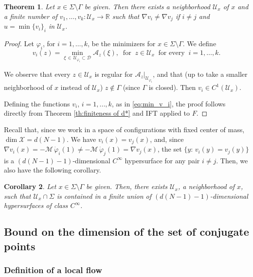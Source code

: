 \documentclass[a4paper,10pt]{amsart}
\theoremstyle{plain}
\newtheorem{thm}{Theorem}
\newtheorem{cor}[thm]{Corollary}
\theoremstyle{definition}
\numberwithin{equation}{section}
\numberwithin{thm}{section}
\begin{document}
\begin{thm}\label{thm:finite_number_vi}
Let $x \in \Sigma \setminus \Gamma$ be given. Then there exists a neighborhood $\mathcal U_{x}$ of $x$ and a finite number of $v_1, \dots, v_k : \mathcal U_{x} \to \mathbb R$ such that $\nabla v_i \neq \nabla v_j$ if $i \neq j$ and $u=\min\{v_i\}_i$ in $\mathcal U_{x}$.
\end{thm}
\begin{proof}
Let $\varphi_i$, for $i=1, \dots, k$, be the minimizers for $x \in \Sigma \setminus \Gamma$. We define
\begin{equation}\label{eq:min_v_i}
v_i(z) = \min_{\xi \, \in \,  \mathcal U_{\varphi_i} \subset \mathcal{D}} \mathcal A_z(\xi), \ \mbox{ for } \ z \in \mathcal U_x \ \mbox{ for every } \ i =1, \dots, k.
\end{equation}

We observe that every $z \in \mathcal U_x$ is regular for $\mathcal A_z|_{\mathcal U_{\varphi_i}}$, and that (up to take a smaller neighborhood of $x$ instead of $\mathcal U_x$) $z \notin \Gamma$ (since $\Gamma$ is closed). Then $v_i \in C^1(\mathcal U_x)$. 

Defining the functions $v_i$, $i=1,...,k$, as in \eqref{eq:min_v_i}, the proof follows directly from Theorem \ref{th:finiteness of d*} and IFT applied to $F$.
\end{proof}

Recall that, since we work in a space of configurations with fixed center of mass, $\dim\mathcal{X}=d(N-1)$. We have $v_i(x) = v_j(x)$, and, since $\nabla v_i(x) = -\mathcal M\, \dot \varphi_i(1) \neq -\mathcal M\, \dot \varphi_j(1) = \nabla v_j(x)$, the set $\{y:\, v_i(y)=v_j(y)\}$ is a $(d(N-1)-1)$-dimensional $C^\infty$ hypersurface for any pair $i\neq j$. Then, we also have the following corollary.

\begin{cor}
Let $ x \in \Sigma \setminus \Gamma$ be given. Then, there exists $\mathcal U_x$, a neighborhood of $x$, such that $\mathcal U_x \cap \Sigma$ is contained in a finite union of $(d(N-1)-1)$-dimensional hypersurfaces of class $C^\infty$.
\end{cor}

\subsection{Bound on the dimension of the set of conjugate points}

\subsubsection{Definition of a local flow}
\end{document}

